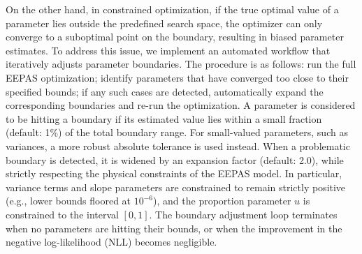 \documentclass[extra,mreferee]{gji}
\theoremstyle{lemma}
\begin{document}






On the other hand, in constrained optimization, if the true optimal value of a parameter lies outside the predefined search space, the optimizer can only converge to a suboptimal point on the boundary, resulting in biased parameter estimates. To address this issue, we implement an automated workflow that iteratively adjusts parameter boundaries. The procedure is as follows: run the full EEPAS optimization; identify parameters that have converged too close to their specified bounds; if any such cases are detected, automatically expand the corresponding boundaries and re-run the optimization.  A parameter is considered to be hitting a boundary if its estimated value lies within a small fraction (default: 1\%) of the total boundary range. For small-valued parameters, such as variances, a more robust absolute tolerance is used instead. When a problematic boundary is detected, it is widened by an expansion factor (default: 2.0), while strictly respecting the physical constraints of the EEPAS model. In particular, variance terms and slope parameters are constrained to remain strictly positive (e.g., lower bounds floored at $10^{-6}$), and the proportion parameter $u$ is constrained to the interval $[0,1]$. The boundary adjustment loop terminates when no parameters are hitting their bounds, or when the improvement in the negative log-likelihood (NLL) becomes negligible.
\end{document}
